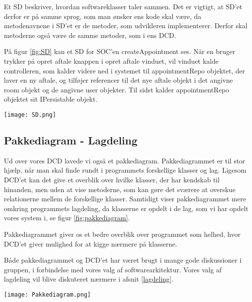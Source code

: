 Et SD beskriver, hvordan softwareklasser taler sammen.
Det er vigtigt, at SD'et derfor er på samme sprog, som man ønsker ens kode skal være, da metodenavnene i SD'et er de metoder, som udvikleren implementerer.
Derfor skal metoderne også være de samme metoder, som i ens DCD.

På figur \ref{fig:SD} kan et SD for SOC'en createAppointment ses.
Når en bruger trykker på opret aftale knappen i opret aftale vinduet, vil vinduet kalde controlleren, som kalder videre ned i systemet til appointmentRepo objektet, der laver en ny aftale, og tilføjer referencer til det nye aftale objekt i det angivne room objekt og de angivne user objekter.
Til sidst kalder appointmentRepo objektet sit IPersistable objekt.

\begin{sidewaysfigure}
    \caption{SD for SOC Operation - createAppointment}
    \centering
        \texttt{[image: SD.png]}
    \label{fig:SD}
\end{sidewaysfigure}

\subsection{Pakkediagram - Lagdeling}
\label{Pakkediagram}

Ud over vores DCD lavede vi også et pakkediagram.
Pakkediagrammet er til stor hjælp, når man skal finde rundt i programmets forskellige klasser og lag.
Ligesom DCD'et kan det give et overblik over hvilke klasser, der har kendskab til hinanden, men uden at vise metoderne, som kan gøre det sværere at overskue relationerne mellem de forskellige klasser.
Samtidigt viser pakkediagrammet mere omkring programmets lagdeling, da klasserne er opdelt i de lag, som vi har opdelt vores system i, se figur \ref{fig:pakkediagram}.

Pakkediagrammet giver os et bedre overblik over programmet som helhed, hvor DCD'et giver mulighed for at kigge nærmere på klasserne.

Både pakkediagrammet og DCD'et har været brugt i mange gode diskussioner i gruppen, i forbindelse med vores valg af softwarearkitektur.
Vores valg af lagdeling vil blive diskuteret nærmere i afsnit \ref{lagdeling}.

\begin{sidewaysfigure}
    \caption{Pakkediagram for systemet}
    \centering
        \texttt{[image: Pakkediagram.png]}
    \label{fig:pakkediagram}
\end{sidewaysfigure}

